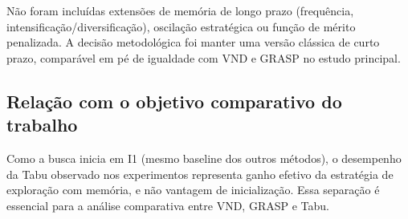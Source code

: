 Não foram incluídas extensões de memória de longo prazo (frequência, intensificação/diversificação), oscilação estratégica ou função de mérito penalizada.
A decisão metodológica foi manter uma versão clássica de curto prazo, comparável em pé de igualdade com VND e GRASP no estudo principal.

\subsection{Relação com o objetivo comparativo do trabalho}

Como a busca inicia em I1 (mesmo baseline dos outros métodos), o desempenho da Tabu observado nos experimentos representa ganho efetivo da estratégia de exploração com memória, e não vantagem de inicialização.
Essa separação é essencial para a análise comparativa entre VND, GRASP e Tabu.
